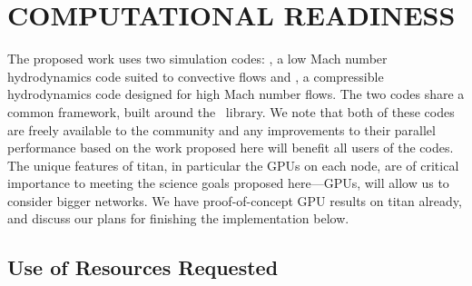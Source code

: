 
\section{COMPUTATIONAL READINESS}




The proposed work uses two simulation codes: \maestro, a low Mach
number hydrodynamics code suited to convective flows and \castro, a
compressible hydrodynamics code designed for high Mach number flows.
The two codes share a common framework, built around the
\boxlib\ library.  We note that both of these codes are freely
available to the community and any improvements to their parallel
performance based on the work proposed here will benefit all users of
the codes.  The unique features of titan, in particular the GPUs on each
node, are of critical importance to meeting the science goals proposed here---GPUs,
will allow us to consider bigger networks. 
We have proof-of-concept GPU results on titan already, and discuss our plans
for finishing the implementation below.


\subsection{Use of Resources Requested}


